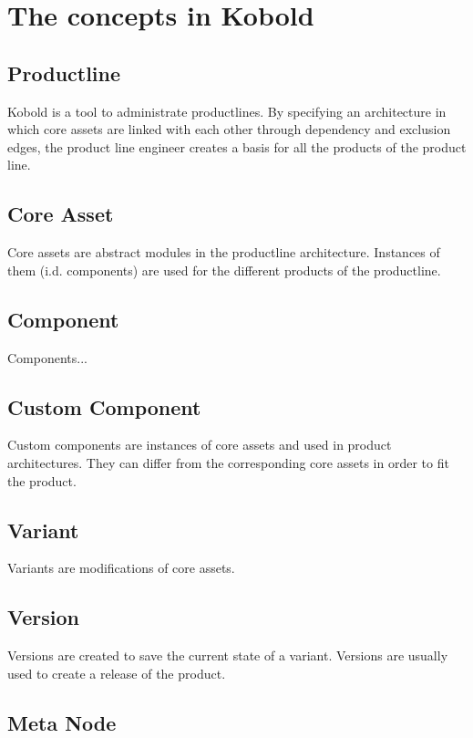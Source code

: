 \chapter{The concepts in Kobold}

\section{Productline}

Kobold is a tool to administrate productlines. By specifying an architecture in which
core assets are linked with each other through dependency and exclusion edges, the product line engineer
creates a basis for all the products of the product line. 

\section{Core Asset}

Core assets are abstract modules in the productline architecture. Instances of them (i.d. components)
are used for the different products of the productline.

\section{Component}

Components...

\section{Custom Component}

Custom components are instances of core assets and used in product architectures. They can
differ from the corresponding core assets in order to fit the product.

\section{Variant}

Variants are modifications of core assets.

\section{Version}

Versions are created to save the current state of a variant. Versions are usually
used to create a release of the product.

\section{Meta Node}

